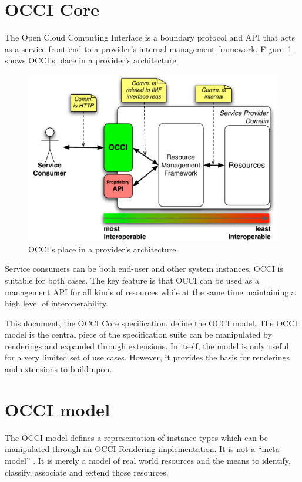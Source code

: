 \documentclass[10pt,a4paper,british]{article}
\begin{document}
\section{OCCI Core}
The Open Cloud Computing Interface is a boundary protocol and API
that acts as a service front-end to a provider's internal management
framework. Figure~\ref{fig:placement} shows OCCI's place in a
provider's architecture.
\begin{figure}[h]
	\centering
	\includegraphics[scale=0.5]{figs/occi-intro.pdf}
	\caption{OCCI's place in a provider's architecture}
	\label{fig:placement}
\end{figure}
Service consumers can be both end-user and other system instances, OCCI is
suitable for both cases. The key feature is that OCCI can be used as a
management API for all kinds of resources while at the same time maintaining a
high level of interoperability.

This document, the OCCI Core specification, define the OCCI model. The OCCI
model is the central piece of the specification suite can be manipulated by
renderings and expanded through extensions. In itself, the model is only useful
for a very limited set of use cases. However, it provides the basis for
renderings and extensions to build upon.

\section{OCCI model}
The OCCI model defines a representation of instance types which can be
manipulated through an OCCI Rendering implementation. It is not a
``meta-model'' \cite{meta-model-ref-something}. It is merely a model of real
world resources and the means to identify, classify, associate and extend those
resources. 
\end{document}
